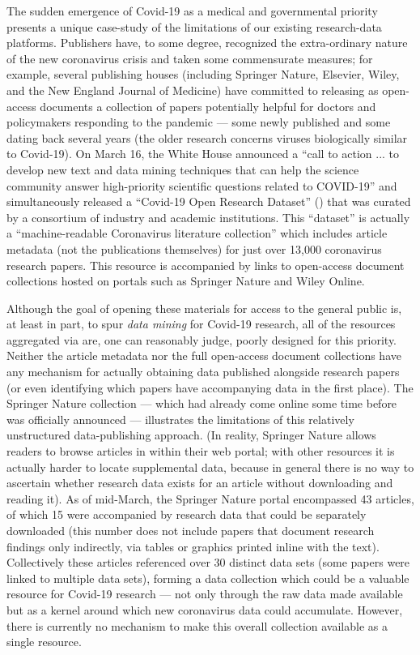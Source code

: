 \documentclass[11pt,letterpaper]{article}
\newcommand{\textscc}[1]{{\color{orr!35!black}{{%
						\fontfamily{Cabin-TLF}\fontseries{b}\selectfont{\textsc{\scriptsize{#1}}}}}}}
\newcommand{\AcronymText}[1]{{\textscc{#1}}}
\newcommand{\Cnineteen}{\resizebox{!}{7.5pt}{\AcronymText{CORD-19}}}
\newcommand{\HTML}{\resizebox{!}{7.5pt}{\AcronymText{HTML}}}
\newcommand{\p}[1]{

\vspace{.85em}#1}
\newcommand{\q}[1]{{\fontfamily{qcr}\selectfont ``}#1{\fontfamily{qcr}\selectfont ''}}
\begin{document}
{\p{The sudden emergence of Covid-19 as a 
medical and governmental priority presents a 
unique case-study of the limitations of our 
existing research-data platforms.  Publishers 
have, to some degree, recognized the extra-ordinary 
nature of the new coronavirus crisis and 
taken some commensurate measures; for example, 
several publishing houses (including Springer Nature, 
Elsevier, Wiley, and the New England Journal 
of Medicine) have committed to releasing as 
open-access documents a collection of papers 
potentially helpful for doctors and 
policymakers responding to the pandemic --- 
some newly published and some dating back several 
years (the older research concerns viruses 
biologically similar to Covid-19).  On 
March 16, the White House announced a 
\q{call to action ... to develop new text and data mining techniques that can help the science community answer high-priority scientific questions related to COVID-19} and simultaneously released 
a  \q{Covid-19 Open Research Dataset} (\Cnineteen{}) that was 
curated by a consortium of industry and academic 
institutions.  This \q{dataset} is actually a 
\q{machine-readable Coronavirus literature collection} 
which includes article metadata (not the publications themselves) 
for just over 13,000 coronavirus research papers.  
This resource is accompanied by links to open-access 
document collections hosted on portals such as 
Springer Nature and Wiley Online.}

\p{Although the goal of opening these materials for 
access to the general public is, at least in part, 
to spur \textit{data mining} for Covid-19 research, 
all of the resources aggregated via \Cnineteen{} are, 
one can reasonably judge,  
poorly designed for this priority.  Neither the article 
metadata nor the full open-access document collections have 
any mechanism for actually obtaining data published 
alongside research papers (or even identifying which papers 
have accompanying data in the first place).  The Springer 
Nature collection --- which had already come online 
some time before \Cnineteen{} was officially announced --- 
illustrates the limitations of this relatively unstructured 
data-publishing approach.  (In reality, Springer Nature 
allows readers to browse articles in \HTML{} within their 
web portal; with other \Cnineteen{} resources it is actually 
harder to locate supplemental data, because in general 
there is no way to ascertain whether research data 
exists for an article without downloading and reading 
it).  As of mid-March, the Springer Nature portal 
encompassed 43 articles, 
of which 15 were accompanied by research data that 
could be separately downloaded (this number does 
not include papers that document research 
findings only indirectly, via tables or graphics 
printed inline with the text).  Collectively 
these articles referenced over 30 distinct data 
sets (some papers were linked to multiple 
data sets), forming a data collection which could 
be a valuable resource for Covid-19 research --- 
not only through the raw data made available 
but as a kernel around which new coronavirus data 
could accumulate.  However, there is currently no 
mechanism to make this overall collection available 
as a single resource.}

}
\end{document}
